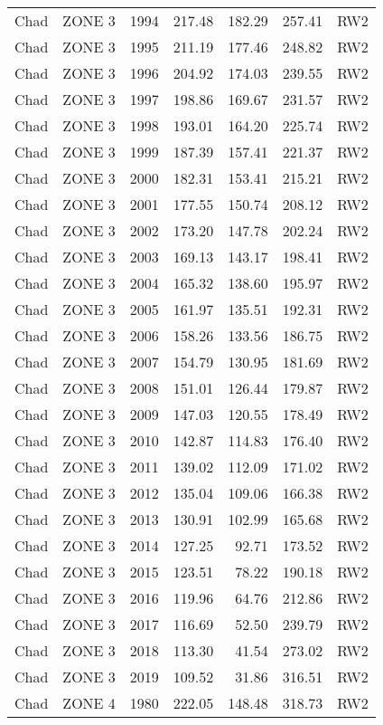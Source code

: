 \begin{longtable}{lllrrrl}
  Chad & ZONE 3 & 1994 & 217.48 & 182.29 & 257.41 & RW2 \\ 
  Chad & ZONE 3 & 1995 & 211.19 & 177.46 & 248.82 & RW2 \\ 
  Chad & ZONE 3 & 1996 & 204.92 & 174.03 & 239.55 & RW2 \\ 
  Chad & ZONE 3 & 1997 & 198.86 & 169.67 & 231.57 & RW2 \\ 
  Chad & ZONE 3 & 1998 & 193.01 & 164.20 & 225.74 & RW2 \\ 
  Chad & ZONE 3 & 1999 & 187.39 & 157.41 & 221.37 & RW2 \\ 
  Chad & ZONE 3 & 2000 & 182.31 & 153.41 & 215.21 & RW2 \\ 
  Chad & ZONE 3 & 2001 & 177.55 & 150.74 & 208.12 & RW2 \\ 
  Chad & ZONE 3 & 2002 & 173.20 & 147.78 & 202.24 & RW2 \\ 
  Chad & ZONE 3 & 2003 & 169.13 & 143.17 & 198.41 & RW2 \\ 
  Chad & ZONE 3 & 2004 & 165.32 & 138.60 & 195.97 & RW2 \\ 
  Chad & ZONE 3 & 2005 & 161.97 & 135.51 & 192.31 & RW2 \\ 
  Chad & ZONE 3 & 2006 & 158.26 & 133.56 & 186.75 & RW2 \\ 
  Chad & ZONE 3 & 2007 & 154.79 & 130.95 & 181.69 & RW2 \\ 
  Chad & ZONE 3 & 2008 & 151.01 & 126.44 & 179.87 & RW2 \\ 
  Chad & ZONE 3 & 2009 & 147.03 & 120.55 & 178.49 & RW2 \\ 
  Chad & ZONE 3 & 2010 & 142.87 & 114.83 & 176.40 & RW2 \\ 
  Chad & ZONE 3 & 2011 & 139.02 & 112.09 & 171.02 & RW2 \\ 
  Chad & ZONE 3 & 2012 & 135.04 & 109.06 & 166.38 & RW2 \\ 
  Chad & ZONE 3 & 2013 & 130.91 & 102.99 & 165.68 & RW2 \\ 
  Chad & ZONE 3 & 2014 & 127.25 & 92.71 & 173.52 & RW2 \\ 
  Chad & ZONE 3 & 2015 & 123.51 & 78.22 & 190.18 & RW2 \\ 
  Chad & ZONE 3 & 2016 & 119.96 & 64.76 & 212.86 & RW2 \\ 
  Chad & ZONE 3 & 2017 & 116.69 & 52.50 & 239.79 & RW2 \\ 
  Chad & ZONE 3 & 2018 & 113.30 & 41.54 & 273.02 & RW2 \\ 
  Chad & ZONE 3 & 2019 & 109.52 & 31.86 & 316.51 & RW2 \\ 
  Chad & ZONE 4 & 1980 & 222.05 & 148.48 & 318.73 & RW2 \\ 

\end{longtable}
